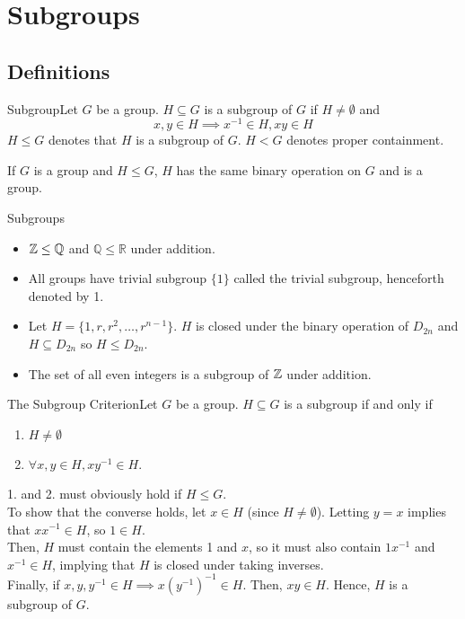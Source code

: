 \documentclass{report}
\newcommand{\mprop}[2]{\begin{Prop}{#1}{}#2\end{Prop}}
\newcommand{\ex}[2]{\begin{Example}{#1}{}#2\end{Example}}
\newcommand{\dfn}[2]{\begin{Definition}[colbacktitle=red!75!black]{#1}{}#2\end{Definition}}
\newenvironment{myproof}[1][\proofname]{%
	\proof[\bfseries #1: ]%
}{\endproof}
\newcommand{\bbQ}{\mathbb{Q}}	\newcommand{\bbR}{\mathbb{R}}
\begin{document}
\chapter{Subgroups}
\section{Definitions}
\dfn{Subgroup}{Let $G$ be a group. $H \subseteq G$ is a subgroup of $G$ if $H \neq \emptyset$ and 
$$x,y \in H \implies x^{-1} \in H, xy \in H$$
$H \leq G$ denotes that $H$ is a subgroup of $G$. $H < G$ denotes proper containment.}
If $G$ is a group and $H \leq G$, $H$ has the same binary operation on $G$ and is a group. 
\ex{Subgroups}{\begin{itemize}
    \item $\bbZ \leq \bbQ$ and $\bbQ \leq \bbR$ under addition.
    \item All groups have trivial subgroup $\{1\}$ called the trivial subgroup, henceforth denoted by 1.
    \item Let $H = \{1, r, r^2, \dots , r^{n-1} \}$. $H$ is closed under the binary operation of $D_{2n}$ and $H \subseteq D_{2n}$ so $H \leq D_{2n}$.
    \item The set of all even integers is a subgroup of $\mathbb{Z}$ under addition.
\end{itemize}}
\mprop{The Subgroup Criterion}{Let $G$ be a group. $H \subseteq G$ is a subgroup if and only if
\begin{enumerate}
    \item $H \neq \emptyset$
    \item $\forall x, y \in H, xy^{-1} \in H$. 
\end{enumerate}}
\begin{myproof}
    1. and 2. must obviously hold if $H \leq G$.\\
    To show that the converse holds, let $x \in H$ (since $H \neq \emptyset$). Letting $y =x$ implies that $xx^{-1} \in H$, so $ 1 \in H$. \\
    Then, $H$ must contain the elements 1 and $x$, so it must also contain $1x^{-1}$ and $x^{-1} \in H$, implying that $H$ is closed under taking inverses.\\
    Finally, if $x,y,y^{-1} \in H \implies  x(y^{-1})^{-1}\in H$. Then, $xy \in H$. Hence, $H$ is a subgroup of $G$. 
\end{myproof}
\end{document}
